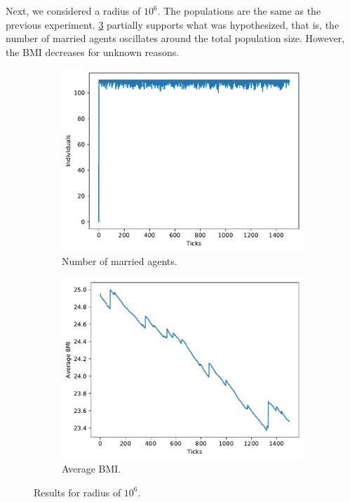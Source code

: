 	Next, we considered a radius of $10^6$. The populations are the same as the previous experiment. \cref{fig:rad1e6} partially supports what was hypothesized, that is, the number of married agents oscillates around the total population size. However, the BMI decreases for unknown reasons.
	\begin{figure}[H]
        \centering
        \begin{subfigure}[b]{0.3\columnwidth}
            \centering
            \includegraphics[width=1\columnwidth]{files/radius-1e6-married.pdf}
            \caption{Number of married agents.}
            \label{subfig:control}
        \end{subfigure} 
        \begin{subfigure}[b]{0.3\columnwidth}
            \centering 
            \includegraphics[width=1\columnwidth]{files/radius-1e6-bmi.pdf}
            \caption{Average BMI.}
            \label{subfig:sol}
        \end{subfigure}
        \caption{Results for radius of $10^6$.}
        \label{fig:rad1e6}
	\end{figure}
	
